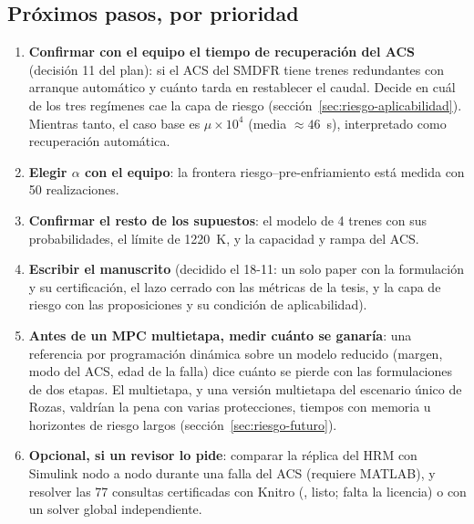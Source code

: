 \subsection{Próximos pasos, por prioridad}
\begin{enumerate}
  \item \textbf{Confirmar con el equipo el tiempo de recuperación del ACS} (decisión 11 del
        plan): si el ACS del SMDFR tiene trenes redundantes con arranque automático y cuánto
        tarda en restablecer el caudal. Decide en cuál de los tres regímenes cae la capa de
        riesgo (sección~\ref{sec:riesgo-aplicabilidad}). Mientras tanto, el caso base es
        $\mu\times10^4$ (media $\approx46$~s), interpretado como recuperación automática.
  \item \textbf{Elegir $\alpha$ con el equipo}: la frontera riesgo--pre-enfriamiento está medida
        con 50 realizaciones.
  \item \textbf{Confirmar el resto de los supuestos}: el modelo de 4 trenes con sus
        probabilidades, el límite de 1220~K, y la capacidad y rampa del ACS.
  \item \textbf{Escribir el manuscrito} (decidido el 18-11: un solo paper con la formulación y
        su certificación, el lazo cerrado con las métricas de la tesis, y la capa de riesgo con
        las proposiciones y su condición de aplicabilidad).
  \item \textbf{Antes de un MPC multietapa, medir cuánto se ganaría}: una referencia por
        programación dinámica sobre un modelo reducido (margen, modo del ACS, edad de la falla)
        dice cuánto se pierde con las formulaciones de dos etapas. El multietapa, y una versión
        multietapa del escenario único de Rozas, valdrían la pena con varias protecciones, tiempos
        con memoria u horizontes de riesgo largos (sección~\ref{sec:riesgo-futuro}).
  \item \textbf{Opcional, si un revisor lo pide}: comparar la réplica del HRM con Simulink nodo a
        nodo durante una falla del ACS (requiere MATLAB), y resolver las 77 consultas
        certificadas con Knitro (, listo; falta la licencia) o con un
        solver global independiente.
\end{enumerate}
